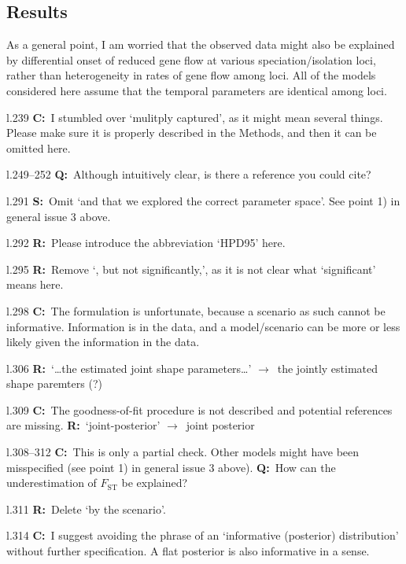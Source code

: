 \documentclass[11pt]{article}
\newenvironment{my_description}
{\begin{description}
  \setlength{\itemsep}{2pt}
  \setlength{\parskip}{0pt}
  \setlength{\parsep}{0pt}}
{\end{description}}
\newcommand{\ra}{$\rightarrow$\ }
\newcommand{\C}{\textbf{C:}\ }
\newcommand{\Q}{\textbf{Q:}\ }
\newcommand{\R}{\textbf{R:}\ }
\newcommand{\V}{\textbf{S:}\ }
\begin{document}
\subsection{Results}
As a general point, I am worried that the observed data might also be explained by differential onset of reduced gene flow at various speciation/isolation loci, rather than heterogeneity in rates of gene flow among loci. All of the models considered here assume that the temporal parameters are identical among loci.
\begin{my_description}
	\item[l.239] \C I stumbled over `mulitply captured', as it might mean several things. Please make sure it is properly described in the Methods, and then it can be omitted here.
	\item[l.249--252] \Q Although intuitively clear, is there a reference you could cite?
	\item[l.291] \V Omit `and that we explored the correct parameter space'. See point 1) in general issue 3 above.
	\item[l.292] \R Please introduce the abbreviation `HPD95' here.
	\item[l.295] \R Remove `, but not significantly,', as it is not clear what `significant' means here.
	\item[l.298] \C The formulation is unfortunate, because a scenario as such cannot be informative. Information is in the data, and a model/scenario can be more or less likely given the information in the data.
	\item[l.306] \R `\dots the estimated joint shape parameters\dots' \ra the jointly estimated shape paremters (?)
	\item[l.309] \C The goodness-of-fit procedure is not described and potential references are missing. \R `joint-posterior' \ra joint posterior
	\item[l.308--312] \C This is only a partial check. Other models might have been misspecified (see point 1) in general issue 3 above). \Q How can the underestimation of $F_\mathrm{ST}$ be explained?
	\item[l.311] \R Delete `by the scenario'.
	\item[l.314] \C I suggest avoiding the phrase of an `informative (posterior) distribution' without further specification. A flat posterior is also informative in a sense.
	
\end{my_description}
\end{document}
